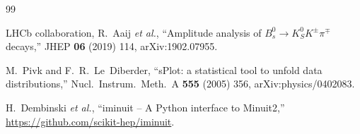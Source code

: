 \documentclass[10pt,leqno]{amsart}
\begin{document}
\begin{thebibliography}{99}

 LHCb collaboration, R.~Aaij \textit{et al.}, ``Amplitude analysis of $B_s^0 \to K_S^0 K^\pm \pi^\mp$ decays,'' JHEP \textbf{06} (2019) 114, arXiv:1902.07955.

 M.~Pivk and F.~R.~Le~Diberder, ``sPlot: a statistical tool to unfold data distributions,'' Nucl.\ Instrum.\ Meth.\ A \textbf{555} (2005) 356, arXiv:physics/0402083.

 H.~Dembinski \textit{et al.}, ``iminuit -- A Python interface to Minuit2,'' \url{https://github.com/scikit-hep/iminuit}.

\end{thebibliography}
\end{document}
